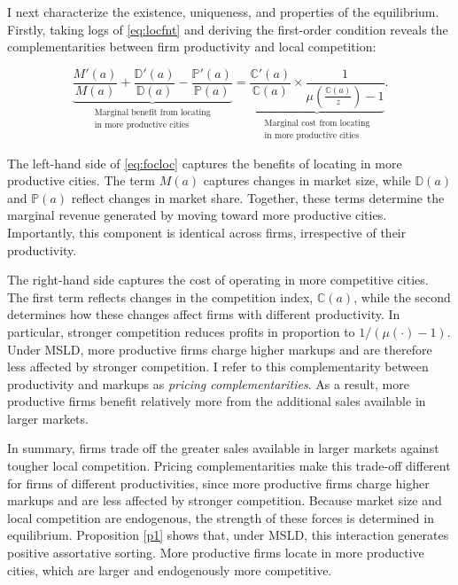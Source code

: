 I next characterize the existence, uniqueness, and properties of the equilibrium. Firstly, taking logs of \eqref{eq:locfnt} and deriving the first-order condition reveals the complementarities between firm productivity and local competition:

\begin{equation}\label{eq:focloc}
	\underbrace{\frac{M'(a)}{M(a)} + \frac{\mathbb{D}'(a)}{\mathbb{D}(a)} - \frac{\mathbb{P}'(a)}{\mathbb{P}(a)}}_{\substack{\text{Marginal benefit from locating} \\ \text{in more productive cities}}} = \underbrace{\frac{\mathbb{C}' (a)}{\mathbb{C}(a)} \times \frac{1}{\mu\left(\frac{\mathbb{C}(a)}{z}\right) - 1}}_{\substack{\text{Marginal cost from locating} \\ \text{in more productive cities}}}. 
\end{equation}

The left-hand side of \eqref{eq:focloc} captures the benefits of locating in more productive cities. The term $M(a)$ captures changes in market size, while $\mathbb{D}(a)$ and $\mathbb{P}(a)$ reflect changes in market share. Together, these terms determine the marginal revenue generated by moving toward more productive cities. Importantly, this component is identical across firms, irrespective of their productivity.

The right-hand side captures the cost of operating in more competitive cities. The first term reflects changes in the competition index, $\mathbb{C}(a)$, while the second determines how these changes affect firms with different productivity. In particular, stronger competition reduces profits in proportion to $1/(\mu(\cdot)-1)$. Under MSLD, more productive firms charge higher markups and are therefore less affected by stronger competition. I refer to this complementarity between productivity and markups as \textit{pricing complementarities}. As a result, more productive firms benefit relatively more from the additional sales available in larger markets.

In summary, firms trade off the greater sales available in larger markets against tougher local competition. Pricing complementarities make this trade-off different for firms of different productivities, since more productive firms charge higher markups and are less affected by stronger competition. Because market size and local competition are endogenous, the strength of these forces is determined in equilibrium. Proposition \ref{p1} shows that, under MSLD, this interaction generates positive assortative sorting. More productive firms locate in more productive cities, which are larger and endogenously more competitive.

